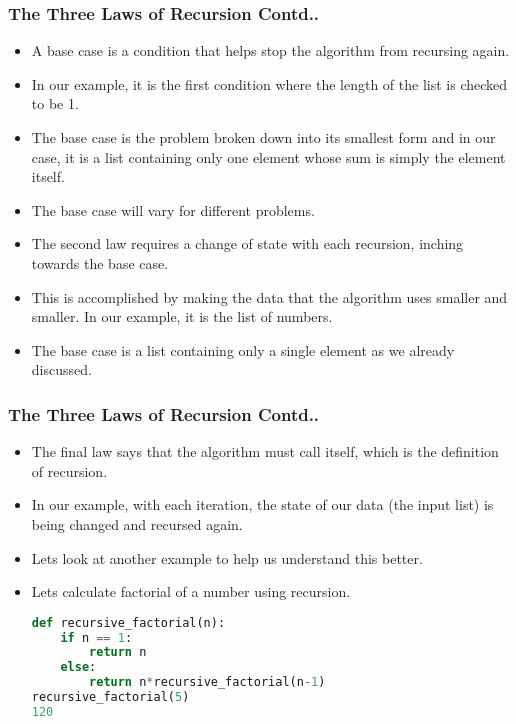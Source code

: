 \documentclass{beamer}
\begin{document}
\begin{frame}
\frametitle{The Three Laws of Recursion Contd..}
\begin{itemize}
\item A base case is a condition that helps stop the algorithm from recursing again.
\item In our example, it is the first condition where the length of the list is checked to be 1.
\item The base case is the problem broken down into its smallest form and in our case, it is a list containing only one element whose sum is simply the element itself.
\item The base case will vary for different problems.
\item The second law requires a change of state with each recursion, inching towards the base case.
\item This is accomplished by making the data that the algorithm uses smaller and smaller. In our example, it is the list of numbers.
\item The base case is a list containing only a single element as we already discussed.
\end{itemize}
\end{frame}

\begin{frame}[fragile]
\frametitle{The Three Laws of Recursion Contd..}
\begin{itemize}
\item The final law says that the algorithm must call itself, which is the definition of recursion.
\item In our example, with each iteration, the state of our data (the input list) is being changed and recursed again.
\item Lets look at another example to help us understand this better.
\item Lets calculate factorial of a number using recursion.
\begin{lstlisting}[language=Python]
def recursive_factorial(n):
    if n == 1:
        return n
    else:
        return n*recursive_factorial(n-1)
recursive_factorial(5)
120
\end{lstlisting}
\end{itemize}
\end{frame}
\end{document}
